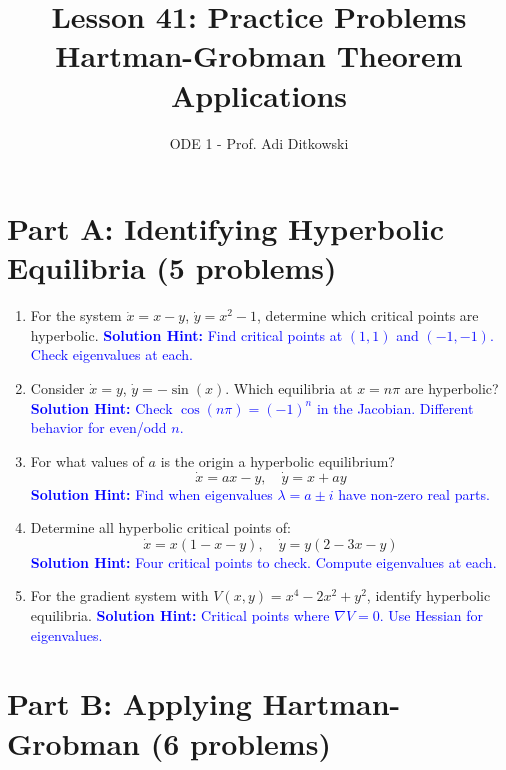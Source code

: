 \documentclass[12pt]{article}
\title{Lesson 41: Practice Problems\\
\large Hartman-Grobman Theorem Applications}
\author{ODE 1 - Prof. Adi Ditkowski}
\date{}
\newcommand{\solution}[1]{\textcolor{blue}{\textbf{Solution Hint:} #1}}
\begin{document}
\maketitle

\section*{Part A: Identifying Hyperbolic Equilibria (5 problems)}

\begin{enumerate}
\item For the system $\dot{x} = x - y$, $\dot{y} = x^2 - 1$, determine which critical points are hyperbolic.
\solution{Find critical points at $(1,1)$ and $(-1,-1)$. Check eigenvalues at each.}

\item Consider $\dot{x} = y$, $\dot{y} = -\sin(x)$. Which equilibria at $x = n\pi$ are hyperbolic?
\solution{Check $\cos(n\pi) = (-1)^n$ in the Jacobian. Different behavior for even/odd $n$.}

\item For what values of $a$ is the origin a hyperbolic equilibrium?
$$\dot{x} = ax - y, \quad \dot{y} = x + ay$$
\solution{Find when eigenvalues $\lambda = a \pm i$ have non-zero real parts.}

\item Determine all hyperbolic critical points of:
$$\dot{x} = x(1 - x - y), \quad \dot{y} = y(2 - 3x - y)$$
\solution{Four critical points to check. Compute eigenvalues at each.}

\item For the gradient system with $V(x,y) = x^4 - 2x^2 + y^2$, identify hyperbolic equilibria.
\solution{Critical points where $\nabla V = 0$. Use Hessian for eigenvalues.}
\end{enumerate}

\section*{Part B: Applying Hartman-Grobman (6 problems)}
\end{document}
